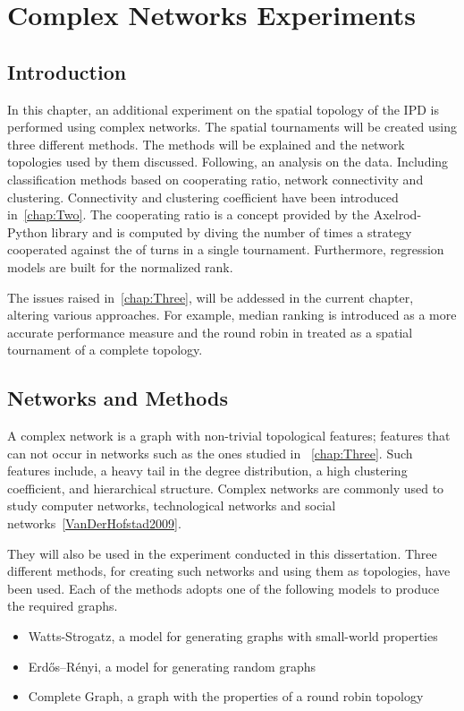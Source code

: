 \chapter{Complex Networks Experiments}
\label{chap:Four}

\section{Introduction}
In this chapter, an additional experiment on the spatial topology of the IPD
is performed using complex networks. The spatial tournaments will be created using
three different methods. The methods will be explained and the network topologies used by them
discussed. Following, an analysis on the data. Including classification methods
based on cooperating ratio, network connectivity and clustering. Connectivity and
clustering coefficient have been introduced in~\autoref{chap:Two}. The cooperating
ratio is a concept provided by the Axelrod-Python library and is computed
by diving the number of times a strategy cooperated against the of turns
in a single tournament. Furthermore, regression models are built for the normalized rank.

The issues raised in~\autoref{chap:Three}, will be addessed in the current chapter,
altering various approaches. For example, median ranking is introduced as a more
accurate performance measure and the round robin in treated as a spatial tournament
of a complete topology.

\section{Networks and Methods}
\label{sub:methods}
A complex network is a graph with non-trivial topological features;
features that can not occur in networks such as the ones studied in ~\autoref{chap:Three}.
Such features include, a heavy tail in the degree distribution, a high
clustering coefficient, and hierarchical structure. Complex networks are commonly
used to study computer networks, technological networks and social networks~\ref{VanDerHofstad2009}.

They will also be used in the experiment conducted in this dissertation. Three
different methods, for creating such networks and using them as topologies, have
been used. Each of the methods adopts one of the following models to produce the
required graphs.

\begin{itemize}
	\item Watts-Strogatz, a model for generating graphs with small-world properties\cite{Watts1998}
	\item Erdős–Rényi, a model for generating random graphs~\cite{Erdos1959}
	\item Complete Graph, a graph with the properties of a round robin topology\cite{Harris2010}
\end{itemize}

